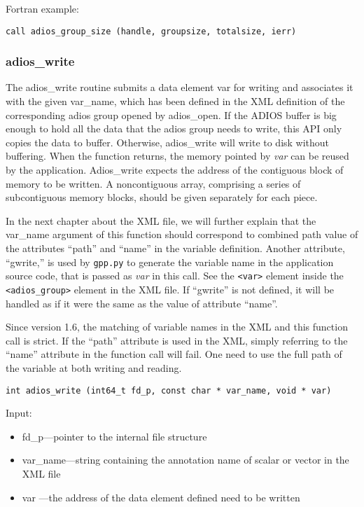 Fortran example: 
\begin{lstlisting}[alsolanguage=Fortran, caption={}]
call adios_group_size (handle, groupsize, totalsize, ierr)
\end{lstlisting}

\subsubsection{adios\_write}
The adios\_write routine submits a data element var for writing and associates 
it with the given var\_name, which has been defined in the XML definition of the 
corresponding adios group opened by 
adios\_open. If the ADIOS buffer is big enough to hold all the data that the adios 
group needs to write, this API only copies the data to buffer. Otherwise, adios\_write 
will write to disk without buffering. When the function returns, the memory pointed
by \textit{var} can be reused by the application. 
Adios\_write expects the address of the contiguous block of memory to be written. 
A noncontiguous array, comprising a series of subcontiguous memory blocks, 
should be given separately for each piece.

In the next chapter about the XML file, we will further explain that the var\_name
argument of this function should correspond to combined path value of the
attributes ``path'' and ``name'' in the variable definition. 
Another attribute, ``gwrite,'' is used by \verb+gpp.py+ to generate the variable name in
the application source code, that is passed as \textit{var} in this call. 
See the \verb+<var>+ element inside the \verb+<adios_group>+ element 
in the XML file. 
If ``gwrite'' is not defined, it will be handled as if it were the same as the value of attribute ``name''.

Since version 1.6, the matching of variable names in the XML and this function call 
is strict. If the ``path'' attribute is used in the XML, simply referring to the 
``name'' attribute in the function call will fail. One need to use the full path of 
the variable at both writing and reading. 

\begin{lstlisting}[alsolanguage=C,caption={},label={}]
int adios_write (int64_t fd_p, const char * var_name, void * var)
\end{lstlisting}

Input:
\begin{itemize}
\item fd\_p---pointer to the internal file structure
\item var\_name---string containing the annotation name of scalar or vector in the XML file
\item var ---the address of the data element defined need to be written
\end{itemize}

